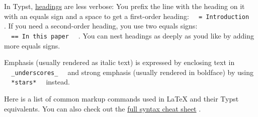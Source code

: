 In Typst, \href{/docs/reference/model/heading/}{headings} are less
verbose: You prefix the line with the heading on it with an equals sign
and a space to get a first-order heading:
\texttt{\ }{\texttt{\ =\ Introduction\ }}\texttt{\ } . If you need a
second-order heading, you use two equals signs:
\texttt{\ }{\texttt{\ ==\ In\ this\ paper\ }}\texttt{\ } . You can nest
headings as deeply as you\textquotesingle d like by adding more equals
signs.

Emphasis (usually rendered as italic text) is expressed by enclosing
text in \texttt{\ }{\texttt{\ \_underscores\_\ }}\texttt{\ } and strong
emphasis (usually rendered in boldface) by using
\texttt{\ }{\texttt{\ *stars*\ }}\texttt{\ } instead.

Here is a list of common markup commands used in LaTeX and their Typst
equivalents. You can also check out the
\href{/docs/reference/syntax/}{full syntax cheat sheet} .


